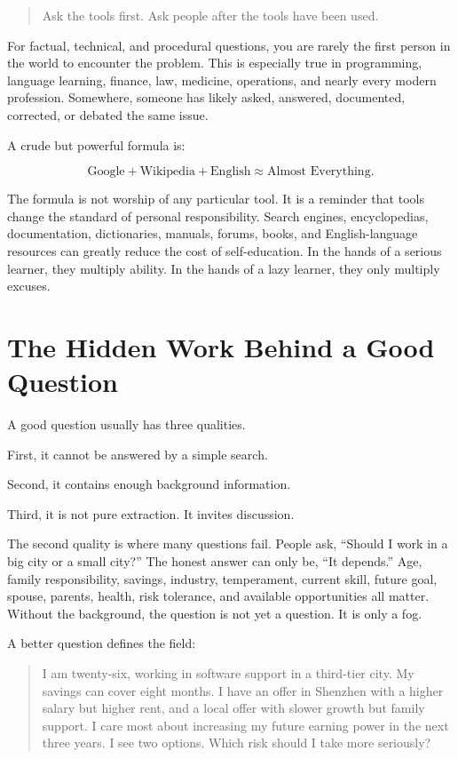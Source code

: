 \begin{quote}
Ask the tools first. Ask people after the tools have been used.
\end{quote}

For factual, technical, and procedural questions, you are rarely the first person in the world to encounter the problem. This is especially true in programming, language learning, finance, law, medicine, operations, and nearly every modern profession. Somewhere, someone has likely asked, answered, documented, corrected, or debated the same issue.

A crude but powerful formula is:

\[
\text{Google} + \text{Wikipedia} + \text{English} \approx \text{Almost Everything}.
\]

The formula is not worship of any particular tool. It is a reminder that tools change the standard of personal responsibility. Search engines, encyclopedias, documentation, dictionaries, manuals, forums, books, and English-language resources can greatly reduce the cost of self-education. In the hands of a serious learner, they multiply ability. In the hands of a lazy learner, they only multiply excuses.

\section*{The Hidden Work Behind a Good Question}

A good question usually has three qualities.

First, it cannot be answered by a simple search.

Second, it contains enough background information.

Third, it is not pure extraction. It invites discussion.

The second quality is where many questions fail. People ask, ``Should I work in a big city or a small city?'' The honest answer can only be, ``It depends.'' Age, family responsibility, savings, industry, temperament, current skill, future goal, spouse, parents, health, risk tolerance, and available opportunities all matter. Without the background, the question is not yet a question. It is only a fog.

A better question defines the field:

\begin{quote}
I am twenty-six, working in software support in a third-tier city. My savings can cover eight months. I have an offer in Shenzhen with a higher salary but higher rent, and a local offer with slower growth but family support. I care most about increasing my future earning power in the next three years. I see two options. Which risk should I take more seriously?
\end{quote}

